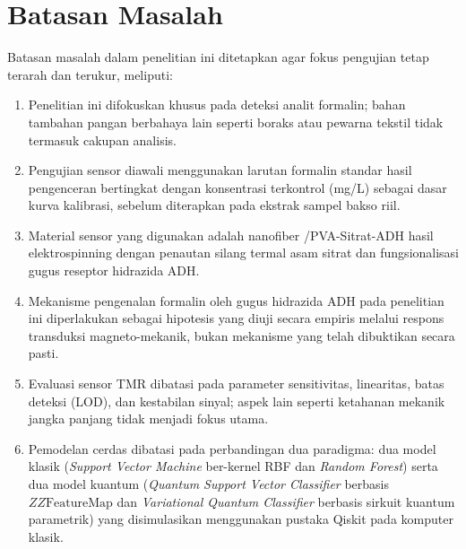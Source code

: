 \section{Batasan Masalah}
Batasan masalah dalam penelitian ini ditetapkan agar fokus pengujian tetap terarah dan terukur, meliputi:
\begin{enumerate}
    \item Penelitian ini difokuskan khusus pada deteksi analit formalin; bahan tambahan pangan berbahaya lain seperti boraks atau pewarna tekstil tidak termasuk cakupan analisis.
    \item Pengujian sensor diawali menggunakan larutan formalin standar hasil pengenceran bertingkat dengan konsentrasi terkontrol (mg/L) sebagai dasar kurva kalibrasi, sebelum diterapkan pada ekstrak sampel bakso riil.
    \item Material sensor yang digunakan adalah nanofiber /PVA-Sitrat-ADH hasil elektrospinning dengan penautan silang termal asam sitrat dan fungsionalisasi gugus reseptor hidrazida ADH.
    \item Mekanisme pengenalan formalin oleh gugus hidrazida ADH pada penelitian ini diperlakukan sebagai hipotesis yang diuji secara empiris melalui respons transduksi magneto-mekanik, bukan mekanisme yang telah dibuktikan secara pasti.
    \item Evaluasi sensor TMR dibatasi pada parameter sensitivitas, linearitas, batas deteksi (LOD), dan kestabilan sinyal; aspek lain seperti ketahanan mekanik jangka panjang tidak menjadi fokus utama.
    \item Pemodelan cerdas dibatasi pada perbandingan dua paradigma: dua model klasik (\textit{Support Vector Machine} ber-kernel RBF dan \textit{Random Forest}) serta dua model kuantum (\textit{Quantum Support Vector Classifier} berbasis $ZZ\text{FeatureMap}$ dan \textit{Variational Quantum Classifier} berbasis sirkuit kuantum parametrik) yang disimulasikan menggunakan pustaka Qiskit pada komputer klasik.
\end{enumerate}


